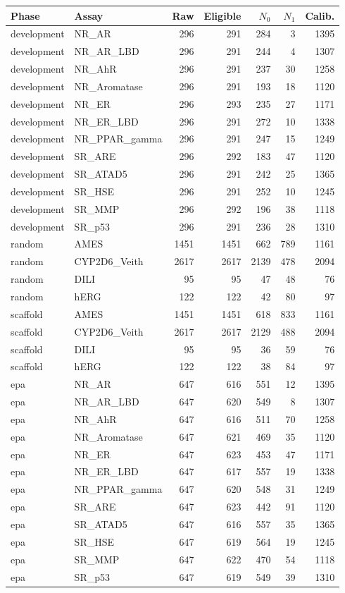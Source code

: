 \begin{tabular}{llrrrrr}\toprule
Phase & Assay & Raw & Eligible & $N_0$ & $N_1$ & Calib. \\
\midrule
development & NR\_AR & 296 & 291 & 284 & 3 & 1395 \\
development & NR\_AR\_LBD & 296 & 291 & 244 & 4 & 1307 \\
development & NR\_AhR & 296 & 291 & 237 & 30 & 1258 \\
development & NR\_Aromatase & 296 & 291 & 193 & 18 & 1120 \\
development & NR\_ER & 296 & 293 & 235 & 27 & 1171 \\
development & NR\_ER\_LBD & 296 & 291 & 272 & 10 & 1338 \\
development & NR\_PPAR\_gamma & 296 & 291 & 247 & 15 & 1249 \\
development & SR\_ARE & 296 & 292 & 183 & 47 & 1120 \\
development & SR\_ATAD5 & 296 & 291 & 242 & 25 & 1365 \\
development & SR\_HSE & 296 & 291 & 252 & 10 & 1245 \\
development & SR\_MMP & 296 & 292 & 196 & 38 & 1118 \\
development & SR\_p53 & 296 & 291 & 236 & 28 & 1310 \\
random & AMES & 1451 & 1451 & 662 & 789 & 1161 \\
random & CYP2D6\_Veith & 2617 & 2617 & 2139 & 478 & 2094 \\
random & DILI & 95 & 95 & 47 & 48 & 76 \\
random & hERG & 122 & 122 & 42 & 80 & 97 \\
scaffold & AMES & 1451 & 1451 & 618 & 833 & 1161 \\
scaffold & CYP2D6\_Veith & 2617 & 2617 & 2129 & 488 & 2094 \\
scaffold & DILI & 95 & 95 & 36 & 59 & 76 \\
scaffold & hERG & 122 & 122 & 38 & 84 & 97 \\
epa & NR\_AR & 647 & 616 & 551 & 12 & 1395 \\
epa & NR\_AR\_LBD & 647 & 620 & 549 & 8 & 1307 \\
epa & NR\_AhR & 647 & 616 & 511 & 70 & 1258 \\
epa & NR\_Aromatase & 647 & 621 & 469 & 35 & 1120 \\
epa & NR\_ER & 647 & 623 & 453 & 47 & 1171 \\
epa & NR\_ER\_LBD & 647 & 617 & 557 & 19 & 1338 \\
epa & NR\_PPAR\_gamma & 647 & 620 & 548 & 31 & 1249 \\
epa & SR\_ARE & 647 & 623 & 442 & 91 & 1120 \\
epa & SR\_ATAD5 & 647 & 616 & 557 & 35 & 1365 \\
epa & SR\_HSE & 647 & 619 & 564 & 19 & 1245 \\
epa & SR\_MMP & 647 & 622 & 470 & 54 & 1118 \\
epa & SR\_p53 & 647 & 619 & 549 & 39 & 1310 \\
\bottomrule\end{tabular}
